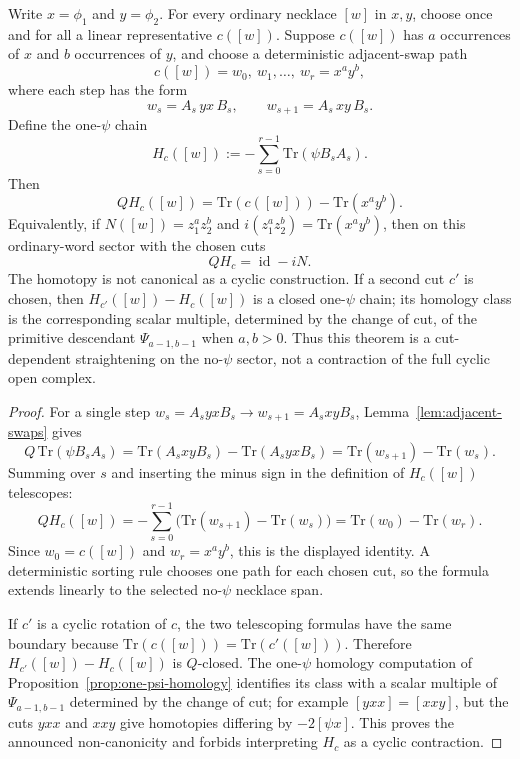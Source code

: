 \documentclass[11pt]{memoir}
\begin{document}
\begin{thm}
\label{thm:normal-ordering-straightening-homotopy}
  Write \(x=\phi_1\) and \(y=\phi_2\).  For every ordinary necklace
  \([w]\) in \(x,y\), choose once and for all a linear representative
  \(c([w])\).  Suppose \(c([w])\) has \(a\) occurrences of \(x\) and \(b\)
  occurrences of \(y\), and choose a deterministic adjacent-swap path
  \[
    c([w])=w_0,\ w_1,\ldots,\ w_r=x^ay^b,
  \]
  where each step has the form
  \[
    w_s=A_s\,yx\,B_s,\qquad w_{s+1}=A_s\,xy\,B_s .
  \]
  Define the one-\(\psi\) chain
  \[
    H_c([w]):=-\sum_{s=0}^{r-1}\mathrm{Tr}(\psi B_sA_s).
  \]
  Then
  \[
    QH_c([w])=\mathrm{Tr}(c([w]))-\mathrm{Tr}(x^ay^b).
  \]
  Equivalently, if
  \(N([w])=z_1^az_2^b\) and
  \(i(z_1^az_2^b)=\mathrm{Tr}(x^ay^b)\), then on this ordinary-word
  sector with the chosen cuts
  \[
    QH_c=\operatorname{id}-iN.
  \]
  The homotopy is not canonical as a cyclic construction.  If a second cut
  \(c'\) is chosen, then \(H_{c'}([w])-H_c([w])\) is a closed
  one-\(\psi\) chain; its homology class is the corresponding
  scalar multiple, determined by the change of cut, of the primitive
  descendant \(\Psi_{a-1,b-1}\) when \(a,b>0\).  Thus this theorem is a
  cut-dependent straightening on the no-\(\psi\) sector, not a contraction
  of the full cyclic open complex.
\end{thm}

\begin{proof}
  For a single step \(w_s=A_syxB_s\to w_{s+1}=A_sxyB_s\),
  Lemma~\ref{lem:adjacent-swaps} gives
  \[
    Q\,\mathrm{Tr}(\psi B_sA_s)
      =\mathrm{Tr}(A_sxyB_s)-\mathrm{Tr}(A_syxB_s)
      =\mathrm{Tr}(w_{s+1})-\mathrm{Tr}(w_s).
  \]
  Summing over \(s\) and inserting the minus sign in the definition of
  \(H_c([w])\) telescopes:
  \[
    QH_c([w])
      =-\sum_{s=0}^{r-1}
        \bigl(\mathrm{Tr}(w_{s+1})-\mathrm{Tr}(w_s)\bigr)
      =\mathrm{Tr}(w_0)-\mathrm{Tr}(w_r).
  \]
  Since \(w_0=c([w])\) and \(w_r=x^ay^b\), this is the displayed identity.
  A deterministic sorting rule chooses one path for each chosen cut, so the
  formula extends linearly to the selected no-\(\psi\) necklace span.

  If \(c'\) is a cyclic rotation of \(c\), the two telescoping formulas have
  the same boundary because \(\mathrm{Tr}(c([w]))=\mathrm{Tr}(c'([w]))\).
  Therefore \(H_{c'}([w])-H_c([w])\) is \(Q\)-closed.  The one-\(\psi\)
  homology computation of Proposition~\ref{prop:one-psi-homology} identifies
  its class with a scalar multiple of
  \(\Psi_{a-1,b-1}\) determined by the change of cut; for example \([yxx]=[xxy]\), but the cuts \(yxx\)
  and \(xxy\) give homotopies differing by \(-2[\psi x]\).  This proves
  the announced non-canonicity and forbids interpreting \(H_c\) as a cyclic
  contraction.
\end{proof}
\end{document}
